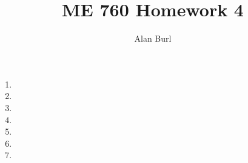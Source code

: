 \documentclass[12pt]{article}
\author{Alan Burl}
\title{ME 760 Homework 4}
\begin{document}
\maketitle
\clearpage
\begin{enumerate}
	\item \clearpage 
	\item \clearpage %
	\item \clearpage %
	\item \clearpage %
	\item \clearpage 
	\item \clearpage 
	\item \clearpage 

\end{enumerate}
\clearpage
\end{document}
